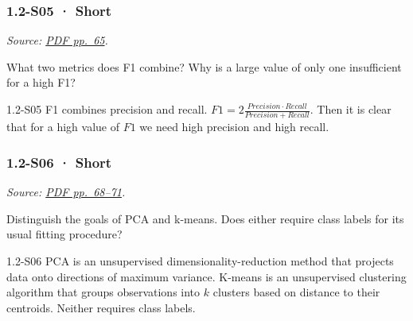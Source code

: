 \noindent\begin{minipage}{\linewidth}

\subsubsection{1.2-S05 · Short}\label{s05-short-1}

\emph{Source:
\href{../Lecture\%20Slides/1.2.\%20Shallow\%20Learning.pdf\#page=65}{PDF
pp.~65}.}

What two metrics does F1 combine? Why is a large value of only one
insufficient for a high F1?

\begin{solution}[20mm]{1.2-S05}
F1 combines precision and recall. $F1 = 2\frac{Precision \cdot Recall}{Precision + Recall}$. Then it is clear that for a high value of $F1$ we need high precision and high recall.
\end{solution}
\end{minipage}\par\medskip

\noindent\begin{minipage}{\linewidth}

\subsubsection{1.2-S06 · Short}\label{s06-short-1}

\emph{Source:
\href{../Lecture\%20Slides/1.2.\%20Shallow\%20Learning.pdf\#page=68}{PDF
pp.~68--71}.}

Distinguish the goals of PCA and k-means. Does either require class
labels for its usual fitting procedure?

\begin{solution}[20mm]{1.2-S06}
PCA is an unsupervised dimensionality-reduction method that projects data onto directions of maximum variance. K-means is an unsupervised clustering algorithm that groups observations into \(k\) clusters based on distance to their centroids. Neither requires class labels.
\end{solution}
\end{minipage}\par\medskip

